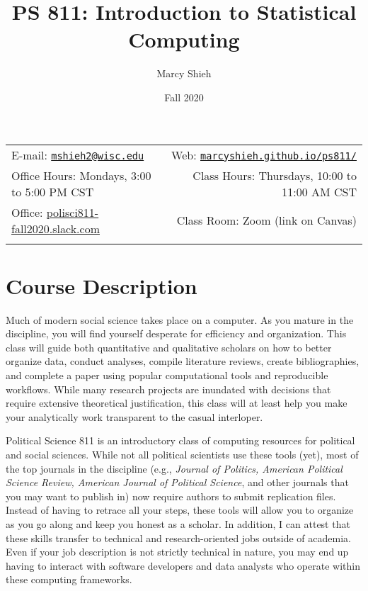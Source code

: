 \documentclass[11pt,]{article}
\title{PS 811: Introduction to Statistical Computing}
\author{Marcy Shieh}
\date{Fall 2020}
\begin{document}
  

		\maketitle
		
	
		\thispagestyle{firststyle}



	\noindent \begin{tabular*}{\textwidth}{ @{\extracolsep{\fill}} lr @{\extracolsep{\fill}}}


E-mail: \texttt{\href{mailto:mshieh2@wisc.edu}{\nolinkurl{mshieh2@wisc.edu}}} & Web: \href{http://marcyshieh.github.io/ps811/}{\tt marcyshieh.github.io/ps811/}\\
Office Hours: Mondays, 3:00 to 5:00 PM CST  &  Class Hours: Thursdays, 10:00 to 11:00 AM CST\\
Office: \url{polisci811-fall2020.slack.com}  & Class Room: Zoom (link on Canvas)\\
	&  \\
	\hline
	\end{tabular*}
	
\vspace{2mm}
	


\hypertarget{course-description}{%
\section{Course Description}\label{course-description}}

Much of modern social science takes place on a computer. As you mature
in the discipline, you will find yourself desperate for efficiency and
organization. This class will guide both quantitative and qualitative
scholars on how to better organize data, conduct analyses, compile
literature reviews, create bibliographies, and complete a paper using
popular computational tools and reproducible workflows. While many
research projects are inundated with decisions that require extensive
theoretical justification, this class will at least help you make your
analytically work transparent to the casual interloper.

Political Science 811 is an introductory class of computing resources
for political and social sciences. While not all political scientists
use these tools (yet), most of the top journals in the discipline (e.g.,
\emph{Journal of Politics, American Political Science Review, American
Journal of Political Science}, and other journals that you may want to
publish in) now require authors to submit replication files. Instead of
having to retrace all your steps, these tools will allow you to organize
as you go along and keep you honest as a scholar. In addition, I can
attest that these skills transfer to technical and research-oriented
jobs outside of academia. Even if your job description is not strictly
technical in nature, you may end up having to interact with software
developers and data analysts who operate within these computing
frameworks.
\end{document}
